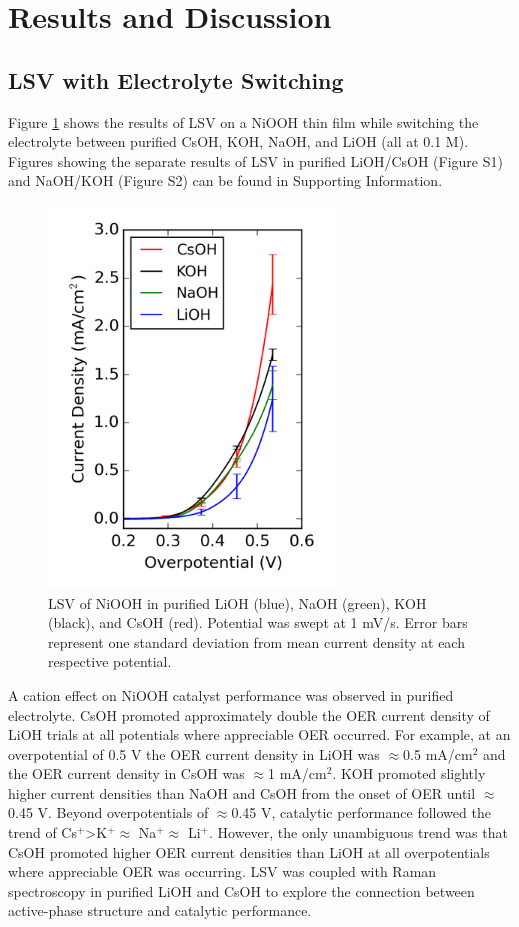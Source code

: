 \documentclass[journal=jpccck,manuscript=article,email=true]{achemso}
\begin{document}
\section{Results and Discussion}
\label{sec-3}
\subsection{LSV with Electrolyte Switching}
\label{sec-3-1}
Figure \ref{fig-1} shows the results of LSV on a NiOOH thin film while switching the electrolyte between purified CsOH, KOH, NaOH, and LiOH (all at 0.1 M). Figures showing the separate results of LSV in purified LiOH/CsOH (Figure S1) and NaOH/KOH (Figure S2) can be found in Supporting Information.

\begin{figure}[h]
\centering
\includegraphics[width=3in]{./images/figures-main/IvsV-Na-K-Li-Cs-pure.png}
\caption{\label{fig-1}LSV of NiOOH in purified LiOH (blue), NaOH (green), KOH (black), and CsOH (red). Potential was swept at 1 mV/s. Error bars represent one standard deviation from mean current density at each respective potential.}
\end{figure}

A cation effect on NiOOH catalyst performance was observed in purified electrolyte. CsOH promoted approximately double the OER current density of LiOH trials at all potentials where appreciable OER occurred. For example, at an overpotential of 0.5 V the OER current density in LiOH was $\approx$0.5 mA/cm$^{\text{2}}$ and the OER current density in CsOH was $\approx$1 mA/cm$^{\text{2}}$. KOH promoted slightly higher current densities than NaOH and CsOH from the onset of OER until $\approx$0.45 V. Beyond overpotentials of $\approx$0.45 V, catalytic performance followed the trend of Cs$^{\text{+}}$\textgreater K$^{\text{+}}$$\approx$ Na$^{\text{+}}$$\approx$ Li$^{\text{+}}$. However, the only unambiguous trend was that CsOH promoted higher OER current densities than LiOH at all overpotentials where appreciable OER was occurring. LSV was coupled with Raman spectroscopy in purified LiOH and CsOH to explore the connection between active-phase structure and catalytic performance.
\end{document}
